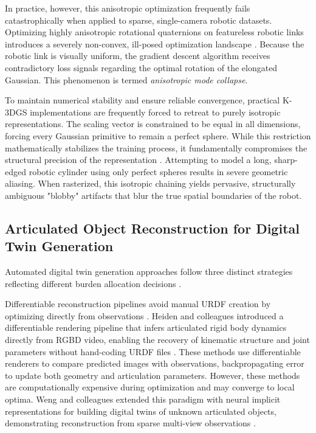 \documentclass[12pt,a4paper,oneside]{report}
\begin{document}
In practice, however, this anisotropic optimization frequently fails catastrophically when applied to sparse, single-camera robotic datasets. Optimizing highly anisotropic rotational quaternions on featureless robotic links introduces a severely non-convex, ill-posed optimization landscape \cite{hu2025learning}. Because the robotic link is visually uniform, the gradient descent algorithm receives contradictory loss signals regarding the optimal rotation of the elongated Gaussian. This phenomenon is termed \textit{anisotropic mode collapse}.

To maintain numerical stability and ensure reliable convergence, practical K-3DGS implementations are frequently forced to retreat to purely isotropic representations. The scaling vector is constrained to be equal in all dimensions, forcing every Gaussian primitive to remain a perfect sphere. While this restriction mathematically stabilizes the training process, it fundamentally compromises the structural precision of the representation \cite{hu2025learning}. Attempting to model a long, sharp-edged robotic cylinder using only perfect spheres results in severe geometric aliasing. When rasterized, this isotropic chaining yields pervasive, structurally ambiguous "blobby" artifacts that blur the true spatial boundaries of the robot.


\subsection{Articulated Object Reconstruction for Digital Twin Generation}

Automated digital twin generation approaches follow three distinct strategies reflecting different burden allocation decisions \cite{heiden2022inferring, weng2024neural, li2025art}.

Differentiable reconstruction pipelines avoid manual URDF creation by optimizing directly from observations \cite{heiden2022inferring, weng2024neural}. Heiden and colleagues introduced a differentiable rendering pipeline that infers articulated rigid body dynamics directly from RGBD video, enabling the recovery of kinematic structure and joint parameters without hand-coding URDF files \cite{heiden2022inferring}. These methods use differentiable renderers to compare predicted images with observations, backpropagating error to update both geometry and articulation parameters. However, these methods are computationally expensive during optimization and may converge to local optima. Weng and colleagues extended this paradigm with neural implicit representations for building digital twins of unknown articulated objects, demonstrating reconstruction from sparse multi-view observations \cite{weng2024neural}.
\end{document}
